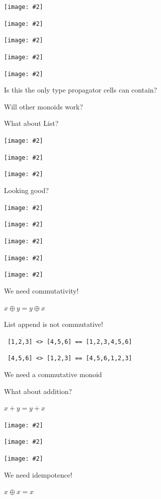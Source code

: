 \documentclass[usenames,dvipsnames,svgnames,table,aspectratio=1610,mathserif]{beamer}
\newcommand{\nl}{\vspace{\baselineskip}}
\newcommand{\pnl}{\pause \nl}
\newcommand{\textslide}[1]{{
\begin{frame}
\begin{center}

#1

\end{center}
\end{frame}
}}
\newcommand{\imageslide}[2][1]{{
\begin{frame}\begin{center}
\texttt{[image: \#2]}
\end{center}\end{frame}
}}
\newcommand{\imageslideleft}[2][1]{{
\begin{frame}
\texttt{[image: \#2]}
\end{frame}
}}
\begin{document}

\imageslide[0.6]{doubleplus4.pdf}
\imageslide[0.6]{doubleplus5.pdf}
\imageslide[0.6]{doubleplus6.pdf}
\imageslide[0.6]{doubleplus7.pdf}
\imageslide[0.6]{doubleplus8.pdf}


\textslide{
\LARGE{
Is this the only type propagator cells can contain?

Will other monoids work?
}

\pnl

\Large{What about List?}
}

\imageslide[0.6]{doubleplus9.pdf}
\imageslide[0.6]{doubleplus10.pdf}
\imageslide[0.6]{doubleplus11.pdf}
\textslide{\Large{Looking good?}}
\imageslide[0.6]{doubleplus12.pdf}
\imageslide[0.6]{doubleplus13.pdf}
\imageslide[0.6]{doubleplus14.pdf}
\imageslide[0.6]{doubleplus11.pdf}
\imageslide[0.6]{doubleplus14.pdf}


\begin{frame}[fragile]
\begin{center}
\Large{
  We need commutativity!

  \nl

  $x \oplus y = y \oplus x$

  \pnl

  List append is not commutative!

  {\tt {
    [1,2,3] <> [4,5,6] == [1,2,3,4,5,6]
  }}

  {\tt {
    [4,5,6] <> [1,2,3] == [4,5,6,1,2,3]
  }}
}
\end{center}
\end{frame}


\textslide{\Large{
We need a commutative monoid

What about addition?

\nl

$x + y = y + x$
}}

\imageslide[0.6]{doubleplus15.pdf}
\imageslide[0.6]{doubleplus16.pdf}
\imageslide[0.6]{doubleplus17.pdf}



\textslide{\Large{
We need idempotence!

\nl

$x \oplus x = x$

}}
\end{document}

